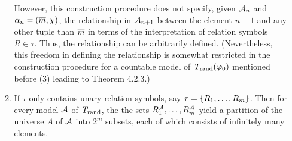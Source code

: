 \begin{enumerate}[1.]
\begin{enumerate}[(1)]
However, this construction procedure does not specify, given $\mathcal{A}_n$ and $\alpha_n = (\vect{m}, \extaxm)$, the relationship in $\mathcal{A}_{n + 1}$ between the element $n + 1$ and any other tuple than $\overline{m}$ in terms of the interpretation of relation symbols $R \in \tau$. Thus, the relationship can be arbitrarily defined. (Nevertheless, this freedom in defining the relationship is somewhat restricted in the construction procedure for a countable model of $\mathit{T}_{\mathrm{rand}}(\varphi_0)$ mentioned before (3) leading to Theorem 4.2.3.)
\item If $\tau$ only contains unary relation symbols, say $\tau = {\{R_1, \ldots, R_m\}}$. Then for every model $\mathcal{A}$ of $\mathit{T}_{\mathrm{rand}}$, the the sets $R_1^{\mathcal{A}}, \ldots, R_m^{\mathcal{A}}$ yield a partition of the universe $A$ of $\mathcal{A}$ into $2^m$ subsets, each of which consists of infinitely many elements.


\end{enumerate}
\end{enumerate}
